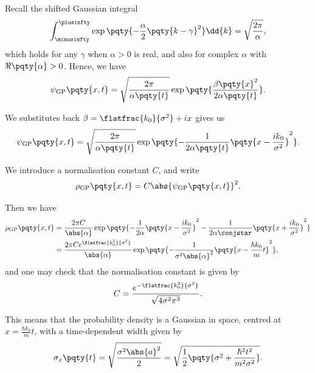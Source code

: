 Recall the shifted Gaussian integral
\begin{equation}
    \int_{\minusinfty}^{\plusinfty} \exp\pqty{- \frac{\alpha}{2} \pqty{k - \gamma}^2} \dd{k} = \sqrt{\frac{2 \pi}{\alpha}},
\end{equation}
which holds for any \(\gamma\) when \(\alpha > 0\) is real, and also for complex \(\alpha\) with \(\Re\pqty{\alpha} > 0\). Hence, we have
\begin{equation}
    \psi_{\text{GP}} \pqty{x, t} = \sqrt{\frac{2 \pi}{\alpha\pqty{t}}} \exp\pqty{\frac{\beta\pqty{x}^2}{2 \alpha\pqty{t}}}.
\end{equation}

We substitutes back \(\beta = \flatfrac{k_0}{\sigma^2} + i x\) gives us
\begin{equation}
    \psi_{\text{GP}} \pqty{x, t} = \sqrt{\frac{2 \pi}{\alpha\pqty{t}}} \exp\pqty{- \frac{1}{2 \alpha\pqty{t}} \pqty{x - \frac{i k_0}{\sigma^2}}^2}.
\end{equation}

We introduce a normalisation constant \(C\), and write
\begin{equation}
    \rho_{\text{GP}} \pqty{x, t} = C \abs{\psi_{\text{GP}} \pqty{x, t}}^2.
\end{equation}

Then we have
\begin{subequations}
    \begin{align}
        \rho_{\text{GP}} \pqty{x, t} &= \frac{2 \pi C}{\abs{\alpha}} \exp\pqty{- \frac{1}{2 \alpha} \pqty{x - \frac{i k_0}{\sigma^2}}^2 - \frac{1}{2 \alpha\conjstar} \pqty{x + \frac{i k_0}{\sigma^2}}^2} \\
        &= \frac{2 \pi C e^{\flatfrac{k_0^2}{\sigma^2}}}{\abs{\alpha}} \exp\pqty{- \frac{1}{\sigma^2 \abs{\alpha}^2} \pqty{x - \frac{\hbar k_0}{m} t}^2},
    \end{align}
\end{subequations}
and one may check that the normalisation constant is given by
\begin{equation}
    C = \frac{e^{-\flatfrac{k_0^2}{\sigma^2}}}{\sqrt{4 \sigma^2 \pi^3}}.
\end{equation}

This means that the probability density is a Gaussian in space, centred at \(x = \frac{\hbar k_0}{m} t\), with a time-dependent width given by
\begin{equation}
    \sigma_x\pqty{t} = \sqrt{\frac{\sigma^2 \abs{a}^2}{2}} = \sqrt{\frac{1}{2} \pqty{\sigma^2 + \frac{\hbar^2 t^2}{m^2 \sigma^2}}}.
\end{equation}


